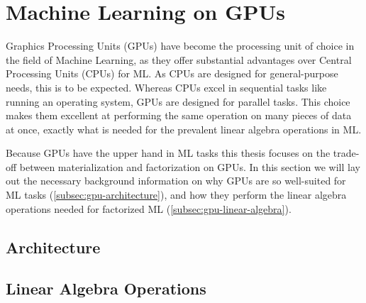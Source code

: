 \section{Machine Learning on GPUs}
\label{sec:2-ml-on-gpu}

Graphics Processing Units (GPUs) have become the processing unit of choice in the field of Machine Learning, as they offer substantial advantages over Central Processing Units (CPUs) for ML. As CPUs are designed for general-purpose needs, this is to be expected. Whereas CPUs excel in sequential tasks like running an operating system, GPUs are designed for parallel tasks. This choice makes them excellent at performing the same operation on many pieces of data at once, exactly what is needed for the prevalent linear algebra operations in ML.

Because GPUs have the upper hand in ML tasks this thesis focuses on the trade-off between materialization and factorization on GPUs. In this section we will lay out the necessary background information on why GPUs are so well-suited for ML tasks (\autoref{subsec:gpu-architecture}), and how they perform the linear algebra operations needed for factorized ML (\autoref{subsec:gpu-linear-algebra}).

\subsection{Architecture}
\label{subsec:gpu-architecture}


\subsection{Linear Algebra Operations}
\label{subsec:gpu-linear-algebra}


